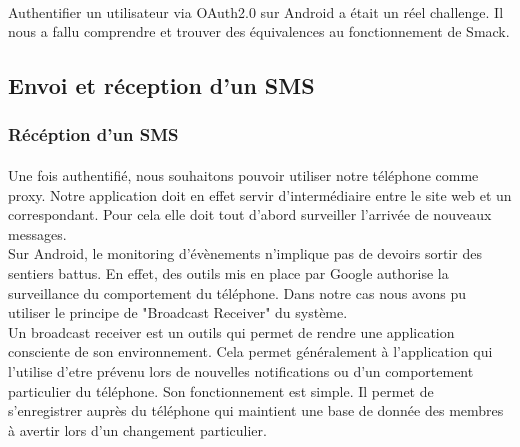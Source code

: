 \paragraph{}
Authentifier un utilisateur via OAuth2.0 sur Android a était un réel challenge. Il nous a fallu comprendre 
et trouver des équivalences au fonctionnement de Smack. 



\subsection{Envoi et réception d'un SMS}



\subsubsection{Récéption d'un SMS}

\paragraph{}
Une fois authentifié, nous souhaitons pouvoir utiliser notre téléphone comme proxy. Notre application
doit en effet servir d'intermédiaire entre le site web et un correspondant. Pour cela elle doit tout
d'abord surveiller l'arrivée de nouveaux messages. 
\\
Sur Android, le monitoring d'évènements n'implique pas de devoirs sortir des sentiers battus. En effet,
des outils mis en place par Google authorise la surveillance du comportement du téléphone. Dans notre cas 
nous avons pu utiliser le principe de "Broadcast Receiver" du système. 
\\
Un broadcast receiver est un outils qui permet de rendre une application consciente de son environnement.
Cela permet généralement à l'application qui l'utilise d'etre prévenu lors de nouvelles notifications ou 
d'un comportement particulier du téléphone.
Son fonctionnement est simple. Il permet de s'enregistrer auprès du téléphone qui maintient une base de donnée des 
membres à avertir lors d'un changement particulier.


